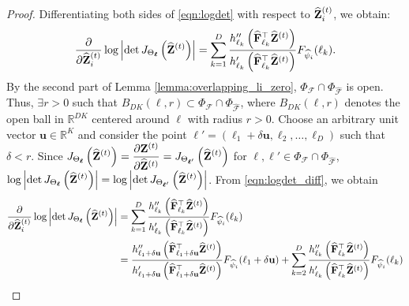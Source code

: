 \begin{proof}
 Differentiating both sides of \eqref{eqn:logdet} with respect to $\widehat{\mathbf{Z}}^{(t)}_i$, we obtain:
  \begin{align}
      \frac{\partial}{\partial \widehat{\mathbf{Z}}^{(t)}_i} \log \left| \det J_{\Theta_\mathbf{\boldsymbol \ell}}\left(\widehat{\mathbf{Z}}^{(t)}\right) \right| = \sum_{k=1}^D \frac{h''_{{{\ell}_k}}\left( \widehat{\mathbf{F}}_{{{\ell}_k}}^\top \widehat{\mathbf{Z}}^{(t)} \right)}{h'_{{{\ell}_k}}\left( \widehat{\mathbf{F}}_{{{\ell}_k}}^\top \widehat{\mathbf{Z}}^{(t)} \right)} F_{\widehat{\psi}_i}({{\ell}_k}). \label{eqn:logdet_diff}
  \end{align}
  By the second part of Lemma \ref{lemma:overlapping_li_zero}, $\Phi_\mathcal{F} \cap \Phi_{\widehat{\mathcal{F}}}$ is open. Thus, $\exists r > 0$ such that $B_{DK} \left(\mathbf{\boldsymbol \ell}, r \right) \subset \Phi_\mathcal{F} \cap \Phi_{\widehat{\mathcal{F}}}$, where $B_{DK}(\mathbf{\boldsymbol \ell}, r)$ denotes the open ball in $\mathbb{R}^{DK}$ centered around $\mathbf{\boldsymbol \ell}$ with radius $r > 0$. Choose an arbitrary unit vector $\mathbf{u} \in \mathbb{R}^K$ and consider the point $\mathbf{\boldsymbol \ell}' = \left(\ell_1+\delta\mathbf{u}, \ell_2, \ldots, \ell_D  \right)$ such that $\delta < r$. Since $\displaystyle J_{\Theta_{\mathbf{\boldsymbol \ell}}} \left( \widehat{\mathbf{Z}}^{(t)} \right) = \frac{\partial \mathbf{Z}^{(t)}}{\partial \widehat{\mathbf{Z}}^{(t)}}  = J_{\Theta_{\mathbf{\boldsymbol \ell}'}}\left( \widehat{\mathbf{Z}}^{(t)} \right)$ for $\boldsymbol{\ell}, \boldsymbol{\ell}' \in \Phi_\mathcal{F} \cap \Phi_{\widehat{\mathcal{F}}}$, $\displaystyle \log \left| \det J_{\Theta_\mathbf{\boldsymbol \ell}} \left( \widehat{\mathbf{Z}}^{(t)} \right) \right| = \log \left| \det J_{\Theta_{\mathbf{\boldsymbol \ell}'}} \left( \widehat{\mathbf{Z}}^{(t)} \right) \right|$. From \eqref{eqn:logdet_diff}, we obtain
  \begin{align}
    \frac{\partial}{\partial \hatZt_i} \log \left| \det J_{\Theta_\mathbf{\boldsymbol \ell}}\left(\hatZt\right) \right|  &= \sum_{k=1}^D \frac{h''_{{{\ell}_k}}\left( \widehat{\mathbf{F}}_{{{\ell}_k}}^\top \hatZt \right)}{h'_{{{\ell}_k}}\left( \widehat{\mathbf{F}}_{{{\ell}_k}}^\top \hatZt \right)} F_{\widehat{\psi}_i}({{\ell}_k}) \nonumber \\
     &= \frac{h''_{\ell_1+\delta \mathbf{u}}\left( \widehat{\mathbf{F}}_{\ell_1+\delta \mathbf{u}}^\top \hatZt \right)}{h'_{\ell_1+\delta \mathbf{u}}\left( \widehat{\mathbf{F}}_{\ell_1+\delta \mathbf{u}}^\top \hatZt \right)} F_{\widehat{\psi}_i}(\ell_1+\delta \mathbf{u})+  \sum_{k=2}^D \frac{h''_{{{\ell}_k}}\left( \widehat{\mathbf{F}}_{{{\ell}_k}}^\top \hatZt \right)}{h'_{{{\ell}_k}}\left( \widehat{\mathbf{F}}_{{{\ell}_k}}^\top \hatZt \right)} F_{\widehat{\psi}_i}({{\ell}_k})\nonumber \\

\end{align}
\end{proof}
